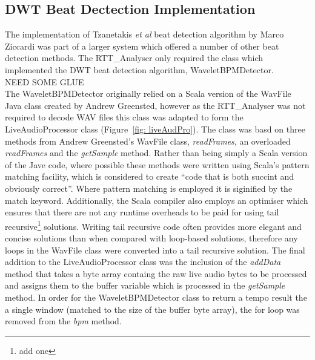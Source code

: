 \documentclass[a4paper, 11pt]{article}
\begin{document}
\subsection{DWT Beat Dectection Implementation}
The implementation of Tzanetakis \textit{et al} beat detection algorithm by Marco Ziccardi\cite{marcoZin} was part of a larger system which offered a number of other beat detection methods. The RTT\_Analyser only required the class which implemented the DWT beat detection algorithm, WaveletBPMDetector.\\

NEED SOME GLUE\\

The WaveletBPMDetector originally relied on a Scala version of the WavFile Java class created by Andrew Greensted\cite{green}, however as the RTT\_Analyser was not required to decode WAV files this class was adapted to form the LiveAudioProcessor class (Figure~\ref{fig: liveAudPro}). The class was basd on three methods from Andrew Greensted's WavFile class\cite{green}, \textit{readFrames}, an overloaded \textit{readFrames} and the \textit{getSample} method. Rather than being simply a Scala version of the Jave code, where possible these methods were written using Scala's pattern matching facility, which is considered to create ``code that is both succint and obviously correct''\cite{mariusEr}. Where pattern matching is employed it is siginified by the match keyword. Additionally, the Scala compiler also employs an optimiser which ensures that there are not any runtime overheads to be paid for using tail recursive\footnote{add one} solutions. Writing tail recursive code often provides more elegant and concise solutions than when compared with loop-based solutions\cite{odesky}, therefore any loops in the WavFile class were converted into a tail recursive solution. The final addition to the LiveAudioProcessor class was the inclusion of the \textit{addData} method that takes a byte array containg the raw live audio bytes to be processed and assigns them to the buffer variable which is processed in the \textit{getSample} method. In order for the WaveletBPMDetector class to return a tempo result the a single window (matched to the size of the buffer byte array), the for loop was removed from the \textit{bpm} method.
\end{document}
